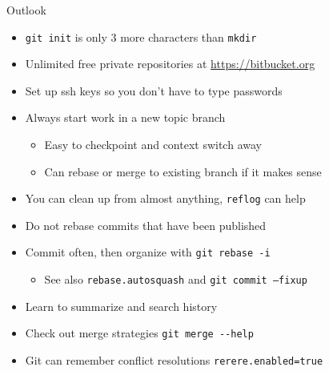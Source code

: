 \documentclass{beamer}
\begin{document}
\begin{frame}{Outlook}
  \begin{itemize}
  \item \texttt{git init} is only 3 more characters than \texttt{mkdir}
  \item Unlimited free private repositories at \url{https://bitbucket.org}
  \item Set up ssh keys so you don't have to type passwords
  \item Always start work in a new topic branch
    \begin{itemize}
    \item Easy to checkpoint and context switch away
    \item Can rebase or merge to existing branch if it makes sense
    \end{itemize}
  \item You can clean up from almost anything, \texttt{reflog} can help
  \item Do not rebase commits that have been published
  \item Commit often, then organize with \texttt{git rebase -i}
    \begin{itemize}
    \item See also \texttt{rebase.autosquash} and \texttt{git commit --fixup}
    \end{itemize}
  \item Learn to summarize and search history
  \item Check out merge strategies \texttt{git merge -{}-help}
  \item Git can remember conflict resolutions \texttt{rerere.enabled=true}
  \end{itemize}
\end{frame}
\end{document}
